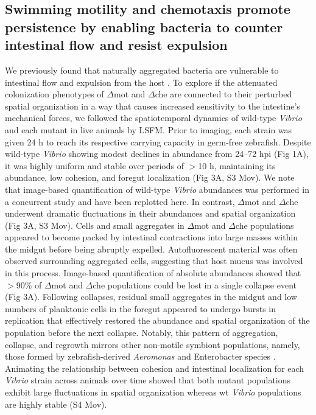 {{\subsection{Swimming motility and chemotaxis promote persistence by enabling bacteria to counter intestinal flow and resist expulsion}
We previously found that naturally aggregated bacteria are vulnerable to intestinal flow and expulsion from the host \cite{wiles_host_2016,schlomann_sublethal_2019}. To explore if the attenuated colonization phenotypes of $\Delta$mot and $\Delta$che are connected to their perturbed spatial organization in a way that causes increased sensitivity to the intestine's mechanical forces, we followed the spatiotemporal dynamics of wild-type \textit{Vibrio} and each mutant in live animals by LSFM. Prior to imaging, each strain was given 24 h to reach its respective carrying capacity in germ-free zebrafish. Despite wild-type \textit{Vibrio} showing modest declines in abundance from 24–72 hpi (Fig 1A), it was highly uniform and stable over periods of $ > $10 h, maintaining its abundance, low cohesion, and foregut localization (Fig 3A, S3 Mov). We note that image-based quantification of wild-type \textit{Vibrio} abundances was performed in a concurrent study \cite{schlomann_sublethal_2019} and have been replotted here. In contrast, $\Delta$mot and $\Delta$che underwent dramatic fluctuations in their abundances and spatial organization (Fig 3A, S3 Mov). Cells and small aggregates in $\Delta$mot and $\Delta$che populations appeared to become packed by intestinal contractions into large masses within the midgut before being abruptly expelled. Autofluorescent material was often observed surrounding aggregated cells, suggesting that host mucus was involved in this process. Image-based quantification of absolute abundances showed that $ > $90\% of $\Delta$mot and $\Delta$che populations could be lost in a single collapse event (Fig 3A). Following collapses, residual small aggregates in the midgut and low numbers of planktonic cells in the foregut appeared to undergo bursts in replication that effectively restored the abundance and spatial organization of the population before the next collapse. Notably, this pattern of aggregation, collapse, and regrowth mirrors other non-motile symbiont populations, namely, those formed by zebrafish-derived \textit{Aeromonas} and Enterobacter species \cite{wiles_host_2016,schlomann_sublethal_2019}. Animating the relationship between cohesion and intestinal localization for each \textit{Vibrio} strain across animals over time showed that both mutant populations exhibit large fluctuations in spatial organization whereas wt \textit{Vibrio} populations are highly stable (S4 Mov).

}}
